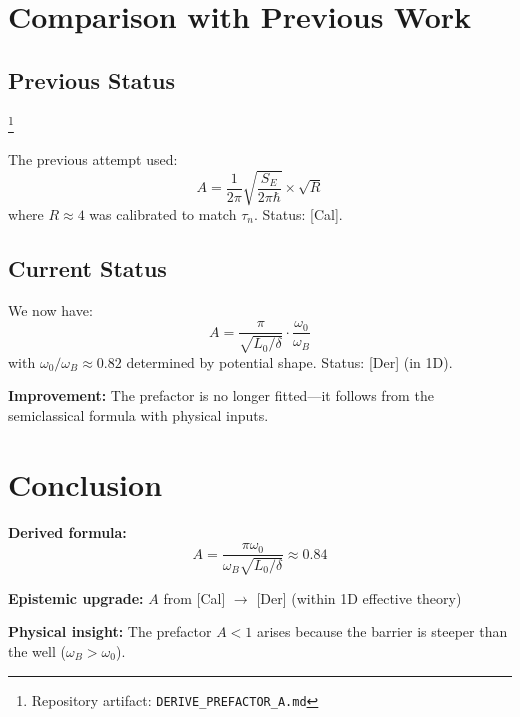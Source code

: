 \documentclass[11pt]{article}
\newcommand{\tagDer}{{\small\textsf{[Der]}}}
\newcommand{\tagCal}{{\small\textsf{[Cal]}}}
\begin{document}
\section{Comparison with Previous Work}

\subsection{Previous Status}\footnote{Repository artifact: \texttt{DERIVE\_PREFACTOR\_A.md}}

The previous attempt used:
\begin{equation}
    A = \frac{1}{2\pi} \sqrt{\frac{S_E}{2\pi\hbar}} \times \sqrt{R}
\end{equation}
where $R \approx 4$ was calibrated to match $\tau_n$. Status: \tagCal{}.

\subsection{Current Status}

We now have:
\begin{equation}
    A = \frac{\pi}{\sqrt{L_0/\delta}} \cdot \frac{\omega_0}{\omega_B}
\end{equation}
with $\omega_0/\omega_B \approx 0.82$ determined by potential shape. Status: \tagDer{} (in 1D).

\textbf{Improvement:} The prefactor is no longer fitted---it follows from the semiclassical formula with physical inputs.

\section{Conclusion}

\begin{tcolorbox}[colback=blue!5!white, colframe=blue!75!black, title=Final Result]
\textbf{Derived formula:}
\begin{equation}
    A = \frac{\pi \omega_0}{\omega_B \sqrt{L_0/\delta}} \approx 0.84
\end{equation}

\textbf{Epistemic upgrade:} $A$ from \tagCal{} $\to$ \tagDer{} (within 1D effective theory)

\textbf{Physical insight:} The prefactor $A < 1$ arises because the barrier is steeper than the well ($\omega_B > \omega_0$).
\end{tcolorbox}
\end{document}
